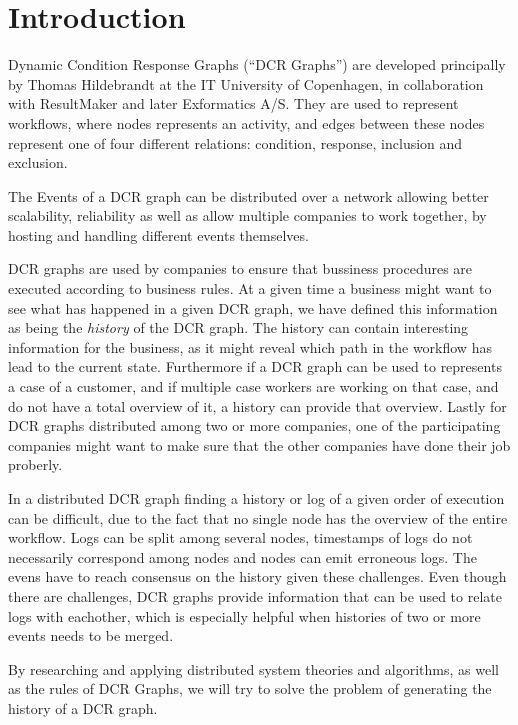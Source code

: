 	\chapter{Introduction}
	Dynamic Condition Response Graphs (“DCR Graphs”) are developed principally by Thomas Hildebrandt at the IT University of Copenhagen, in collaboration with ResultMaker and later Exformatics A/S. They are used to represent workflows, where nodes represents an activity, and edges between these nodes represent one of four different relations: condition, response, inclusion and exclusion. 
	
	\newpar The Events of a DCR graph can be distributed over a network allowing better scalability, reliability as well as allow multiple companies to work together, by hosting and handling different events themselves. 
	
	\newpar DCR graphs are used by companies to ensure that bussiness procedures are executed according to business rules. At a given time a business might want to see what has happened in a given DCR graph, we have defined this information as being the \textit{history} of the DCR graph. The history can contain interesting information for the business, as it might reveal which path in the workflow has lead to the current state. Furthermore if a DCR graph can be used to represents a case of a customer, and if multiple case workers are working on that case, and do not have a total overview of it, a history can provide that overview. Lastly for DCR graphs distributed among two or more companies, one of the participating companies might want to make sure that the other companies have done their job proberly.
	
	\newpar In a distributed DCR graph finding a history or log of a given order of execution can be difficult, due to the fact that no single node has the overview of the entire workflow. Logs can be split among several nodes, timestamps of logs do not necessarily correspond among nodes and nodes can emit erroneous logs. The evens have to reach consensus on the history given these challenges. Even though there are challenges, DCR graphs provide information that can be used to relate logs with eachother, which is especially helpful when histories of two or more events needs to be merged.
	
	\newpar By researching and applying distributed system theories and algorithms, as well as the rules of DCR Graphs, we will try to solve the problem of generating the history of a DCR graph. 